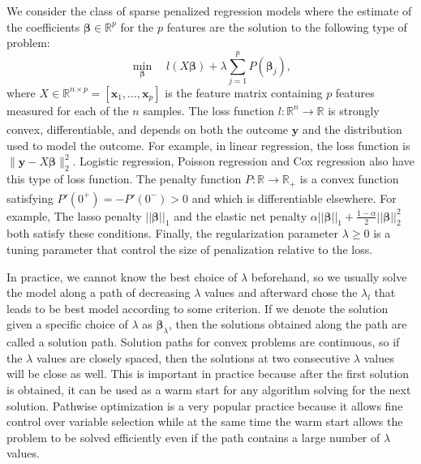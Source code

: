 We consider the class of sparse penalized regression models where the estimate of the coefficients $\boldsymbol\beta\in\mathbb{R}^p$ for the $p$ features are the solution to the following type of problem:
\begin{equation}
    \label{eq:spr}
    \underset{\boldsymbol\beta}{\min}\quad l(X\boldsymbol\beta)+\lambda \sum_{j=1}^pP(\boldsymbol\beta_j),
\end{equation}
where $X\in\mathbb{R}^{n\times p}=[\boldsymbol x_1,...,\boldsymbol x_p]$ is the feature matrix containing $p$ features measured for each of the $n$ samples. The loss function $l:\mathbb{R}^n\xrightarrow[]{}\mathbb{R}$ is strongly convex, differentiable, and depends on both the outcome $\boldsymbol y$ and the distribution used to model the outcome. For example, in linear regression, the loss function is $\lVert\boldsymbol y-X\boldsymbol\beta\rVert_2^2$. Logistic regression, Poisson regression and Cox regression also have this type of loss function. The penalty function $P:\mathbb{R}\xrightarrow[]{}\mathbb{R}_+$ is a convex function satisfying $P'(0^+)=-P'(0^-)>0$ and which is differentiable elsewhere. For example, The lasso penalty $||\boldsymbol\beta||_1$ and the elastic net penalty $\alpha||\boldsymbol\beta||_1+\frac{1-\alpha}{2}||\boldsymbol\beta||_2^2$ both satisfy these conditions. Finally, the regularization parameter $\lambda \ge 0$ is a tuning parameter that control the size of penalization relative to the loss.

In practice, we cannot know the best choice of $\lambda$ beforehand, so we usually solve the model along a path of decreasing $\lambda$ values and afterward chose the $\lambda_l$ that leads to be best model according to some criterion. If we denote the solution given a specific choice of $\lambda$ as $\boldsymbol\beta_\lambda$, then the solutions obtained along the path are called a solution path. Solution paths for convex problems are continuous, so if the $\lambda$ values are closely spaced, then the solutions at two consecutive $\lambda$ values will be close as well. This is important in practice because after the first solution is obtained, it can be used as a warm start for any algorithm solving for the next solution. Pathwise optimization is a very popular practice because it allows fine control over variable selection while at the same time the warm start allows the problem to be solved efficiently even if the path contains a large number of $\lambda$ values. 

